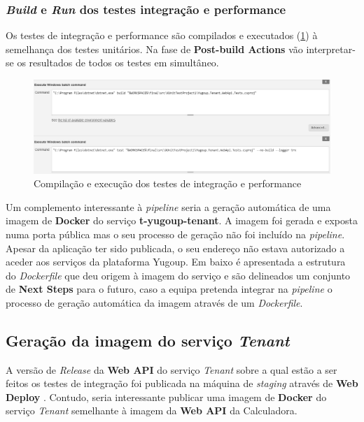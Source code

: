 \subsubsection{\textit{Build} e \textit{Run} dos testes integração e performance}

\hspace{1cm}Os testes de integração e performance são compilados e executados (\ref{Fig:Fig69}) à semelhança dos testes unitários. Na fase de \textbf{Post-build Actions} vão interpretar-se os resultados de todos os testes em simultâneo. 

\begin{figure}[hbt!]
\centering
\includegraphics[width=0.9\linewidth]{Cap6/TenantIntegrationTests.png}
\caption{Compilação e execução dos testes de integração e performance}
\label{Fig:Fig69}
\end{figure}

\hspace{1cm}Um complemento interessante à \textit{pipeline} seria a geração automática de uma imagem de \textbf{Docker} do serviço \textbf{t-yugoup-tenant}. A imagem foi gerada e exposta numa porta pública mas o seu processo de geração não foi incluído na \textit{pipeline}. Apesar da aplicação ter sido publicada, o seu endereço não estava autorizado a aceder aos serviços da plataforma Yugoup. Em baixo é apresentada a estrutura do \textit{Dockerfile} que deu origem à imagem do serviço e são delineados um conjunto de \textbf{Next Steps} para o futuro, caso a equipa pretenda integrar na \textit{pipeline} o processo de geração automática da imagem através de um \textit{Dockerfile}.

\subsection{Geração da imagem do serviço \textit{Tenant}}

\hspace{1cm}A versão de \textit{Release} da \textbf{Web API} do serviço \textit{Tenant} sobre a qual estão a ser feitos os testes de integração foi publicada na máquina de \textit{staging} através de \textbf{Web Deploy} \cite{webdeployiis}. Contudo, seria interessante publicar uma imagem de \textbf{Docker} do serviço \textit{Tenant} semelhante à imagem da \textbf{Web API} da Calculadora. 

